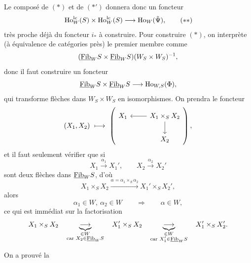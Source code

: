 Le composé de $(*)$ et de $(*')$ donnera donc un foncteur
\[
\Ho^{\lc}_W(S) \times \Ho^{\lc}_W(S) \longrightarrow \Ho_W(\tilde{\Psi}), \tag*{$(**)$}
\]
très proche déjà du foncteur $i_*$ à construire. Pour construire $(*)$, on interprète (à équivalence de catégories près) le premier membre comme
\[
(\underline{\mathrm{Fib}}_W S \times \underline{\mathrm{Fib}}_W S)(W_S \times W_S)^{-1},
\]
donc il faut construire un foncteur
\[
\underline{\mathrm{Fib}}_W S \times \underline{\mathrm{Fib}}_W S \longrightarrow \mathrm{Ho}_{W,S}(\Phi),
\]
qui transforme flèches dans $W_S \times W_S$ en isomorphismes. On prendra le foncteur
\[
(X_1, X_2) \ \longmapsto \
\left(
\begin{tikzcd}[ampersand replacement=\&]
X_1 \& X_1 \times_S X_2 \arrow[l] \arrow[d] \\
 \& X_2
\end{tikzcd}
\right),
\]
et il faut seulement vérifier que si
\[
X_1 \xrightarrow{\alpha_1} X_1', \qquad X_2 \xrightarrow{\alpha_2} X_2'
\]
sont deux flèches dans $\underline{\mathrm{Fib}}_W S$, d'où
\[
X_1 \times_S X_2 \xrightarrow{\alpha = \alpha_1 \times_S \alpha_2} X_1' \times_S X_2',
\]
alors
\[
\alpha_1 \in W,\ \alpha_2 \in W \qquad \Longrightarrow \qquad \alpha \in W,
\]
ce qui est immédiat sur la factorisation
\[
X_1 \times_S X_2 \quad \underbrace{\longrightarrow}_{\substack{\in W \\ \text{car } X_2 \in \underline{\mathrm{Fib}}_W S}} \quad X_1' \times_S X_2 \quad \underbrace{\longrightarrow}_{\substack{\in W \\ \text{car } X_1' \in \underline{\mathrm{Fib}}_W S}} \quad X_1' \times_S X_2'.
\]

On a prouvé la

